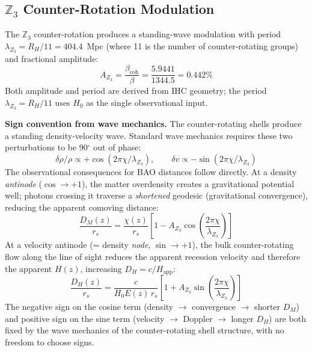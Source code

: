 \documentclass[12pt,a4paper]{article}
\begin{document}
\subsection{\texorpdfstring{$\mathbb{Z}_3$}{Z3} Counter-Rotation Modulation}
\label{sec:z3pred}

The $\mathbb{Z}_3$ counter-rotation produces a standing-wave modulation with period
$\lambda_{Z_3} = R_H/11 = 404.4$~Mpc (where 11 is the number of counter-rotating
groups) and fractional amplitude:
\begin{equation}
  A_{Z_3} = \frac{\beta_\mathrm{coh}}{\beta} = \frac{5.9441}{1344.5} = 0.442\%
\end{equation}
Both amplitude and period are derived from IHC geometry; the period $\lambda_{Z_3} = R_H/11$ uses $H_0$ as the single observational input.

\textbf{Sign convention from wave mechanics.} The counter-rotating shells produce
a standing density-velocity wave. Standard wave mechanics requires these two
perturbations to be 90$^\circ$ out of phase:
\begin{equation}
  \delta\rho/\rho \propto +\cos(2\pi\chi/\lambda_{Z_3}), \qquad
  \delta v \propto -\sin(2\pi\chi/\lambda_{Z_3})
\end{equation}
The observational consequences for BAO distances follow directly. At a density
\emph{antinode} ($\cos \to +1$), the matter overdensity creates a gravitational
potential well; photons crossing it traverse a \emph{shortened} geodesic
(gravitational convergence), reducing the apparent comoving distance:
\begin{equation}
  \frac{D_M(z)}{r_s} = \frac{\chi(z)}{r_s}\left[1 - A_{Z_3}\cos\!\left(\frac{2\pi\chi}{\lambda_{Z_3}}\right)\right]
\end{equation}
At a velocity antinode (= density \emph{node}, $\sin \to +1$), the bulk
counter-rotating flow along the line of sight reduces the apparent recession
velocity and therefore the apparent $H(z)$, increasing $D_H = c/H_\mathrm{app}$:
\begin{equation}
  \frac{D_H(z)}{r_s} = \frac{c}{H_0 E(z)\, r_s}\left[1 + A_{Z_3}\sin\!\left(\frac{2\pi\chi}{\lambda_{Z_3}}\right)\right]
\end{equation}
The negative sign on the cosine term (density $\to$ convergence $\to$ shorter $D_M$)
and positive sign on the sine term (velocity $\to$ Doppler $\to$ longer $D_H$) are
both fixed by the wave mechanics of the counter-rotating shell structure, with no
freedom to choose signs.
\end{document}
